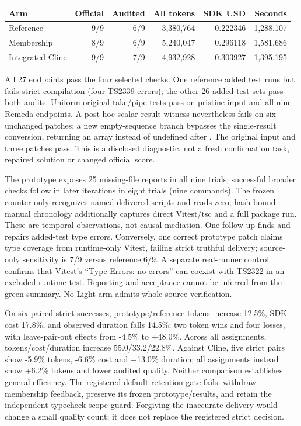 \documentclass[11pt,a4paper]{article}
\newcommand{\code}[1]{\texttt{\detokenize{#1}}}
\begin{document}
\begin{center}\small\begin{tabular}{lrrrrr}\toprule
Arm & Official & Audited & All tokens & SDK USD & Seconds\\\midrule
Reference &9/9&6/9&3,380,764&0.222346&1,288.107\\
Membership &8/9&6/9&5,240,047&0.296118&1,581.686\\
Integrated Cline &9/9&7/9&4,932,928&0.303927&1,395.195\\\bottomrule
\end{tabular}\end{center}
All 27 endpoints pass the four selected checks. One reference added test runs
but fails strict compilation (four TS2339 errors); the other 26 added-test sets
pass both audits. Uniform original take/pipe tests pass on pristine input and
all nine Remeda endpoints. A post-hoc scalar-result witness nevertheless fails
on six unchanged patches: a new empty-sequence branch bypasses the single-result
conversion, returning an array instead of undefined after \code{first()}.
The original input and three patches pass. This is a disclosed diagnostic,
not a fresh confirmation task, repaired solution or changed official score.

The prototype exposes 25 missing-file reports in all nine trials; successful
broader checks follow in later iterations in eight trials (nine commands).
The frozen counter only recognizes named delivered scripts and reads zero;
hash-bound manual chronology additionally captures direct Vitest/tsc and a full
package run. These are temporal observations, not causal mediation. One follow-up
finds and repairs added-test type errors. Conversely, one correct prototype patch
claims type coverage from runtime-only Vitest, failing strict truthful delivery;
source-only sensitivity is 7/9 versus reference 6/9. A separate real-runner
control confirms that Vitest's ``Type Errors: no errors'' can coexist with
TS2322 in an excluded runtime test. Reporting and acceptance cannot be inferred
from the green summary. No Light arm admits whole-source verification.

On six paired strict successes, prototype/reference tokens increase 12.5\%, SDK
cost 17.8\%, and observed duration falls 14.5\%; two token wins and four losses,
with leave-pair-out effects from -4.5\% to +48.0\%. Across all assignments,
tokens/cost/duration increase 55.0/33.2/22.8\%. Against Cline, five strict pairs
show -5.9\% tokens, -6.6\% cost and +13.0\% duration; all assignments instead show
+6.2\% tokens and lower audited quality. Neither comparison establishes general
efficiency. The registered default-retention gate fails: withdraw membership
feedback, preserve its frozen prototype/results, and retain the independent
typecheck scope guard. Forgiving the inaccurate delivery would change a small
quality count; it does not replace the registered strict decision.
\end{document}
